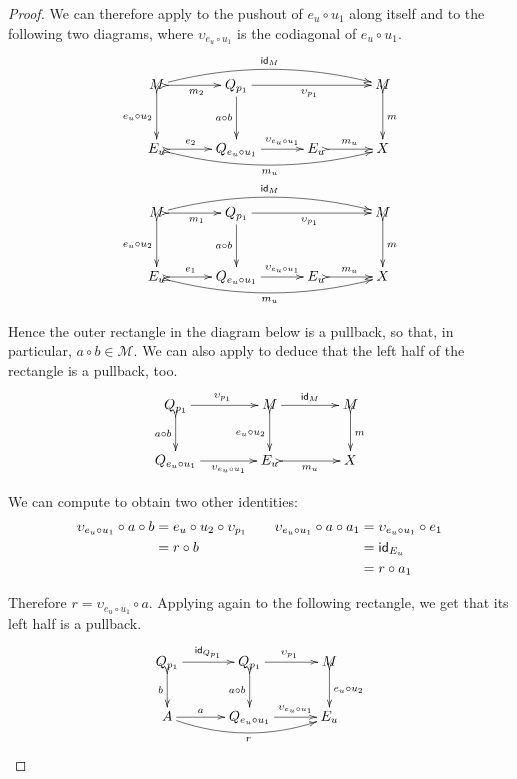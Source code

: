 \begin{proof}
	We can therefore apply  to the pushout of $e_u\circ u_1$ along itself and to the following two diagrams, where $\upsilon_{e_u\circ u_1}$ is the codiagonal of $e_u\circ u_1$.
	\[
	\xymatrix@C=30pt@R=30pt{ M \ar@/^.4cm/[rrr]^{\id{M}} \ar@{>->}[d]_{e_u\circ u_2}\ar@{>->}[r]_{m_2} & Q_{p_1} \ar[rr]_{\upsilon_{p_1}} \ar[d]_{a\circ b} && M\ar@{>->}[d]^{m} \\ E_u \ar@{>->}@/_.4cm/[rrr]_{m_u}\ar@{>->}[r]^-{e_2} & Q_{e_u\circ u_1} \ar[r]^-{\upsilon_{e_u\circ u_1}} &E_u \ar@{>->}[r]^{m_u} &X\\ 
	M\ar@/^.4cm/[rrr]^{\id{M}} \ar@{>->}[d]_{e_u\circ u_2} \ar@{>->}[r]_{m_1}  & Q_{p_1} \ar[rr]_{\upsilon_{p_1}} \ar[d]_{a\circ b}  && M \ar@{>->}[d]^{m}\\ E_u \ar@{>->}@/_.4cm/[rrr]_{m_u}\ar@{>->}[r]^-{e_1}& Q_{e_u\circ u_1} \ar[r]^-{\upsilon_{e_u\circ u_1}} & E_u \ar@{>->}[r]^{m_u} &X }\]
	
	Hence the outer rectangle in the diagram below is a pullback, so that, in particular, $a\circ b\in \mathcal{M}$. We can also apply  to deduce that the left half of the rectangle  is a pullback, too. 
	\[\xymatrix@C=40pt{Q_{p_1} \ar[r]^{\upsilon_{p_1}} \ar@{>->}[d]_{a\circ b} &M \ar[r]^{\id{M}} \ar@{>->}[d]_{e_u\circ u_2}& M \ar@{>->}[d]^{m}\\ Q_{e_u\circ u_1} \ar[r]_-{\upsilon_{e_u\circ u_1}} & E_u \ar@{>->}[r]_{m_u}& X}\]
	
	We can compute to obtain two other identities:
	\[\begin{split}
		\upsilon_{e_u\circ u_1}\circ a\circ b & = e_u\circ u_2\circ \upsilon_{p_1}\\&= r\circ b\\&
	\end{split}\qquad \begin{split}
		\upsilon_{e_u\circ u_1}\circ a\circ a_1 &= \upsilon_{e_u\circ u_1}\circ e_1\\&= \mathsf{id}_{E_u}\\&=r\circ a_1
	\end{split}\]
	
	Therefore $r= \upsilon_{e_u\circ u_1}\circ a$. Applying again  to the following rectangle, we get that its left half is a pullback.
	\[ \xymatrix@C=30pt{Q_{p_1} \ar@{>->}[d]_b \ar[r]^{\id{Q_{p_1}}} & Q_{p_1}  \ar@{>->}[d]_{a\circ b}\ar[r]^{\upsilon_{p_1}}& M \ar@{>->}[d]^{e_u\circ u_2}\\ A \ar@/_.4cm/[rr]_{r}\ar[r]^-a&Q_{e_u\circ u_1} \ar[r]^-{\upsilon_{e_u\circ u_1}}& E_u }\]
	

\end{proof}
